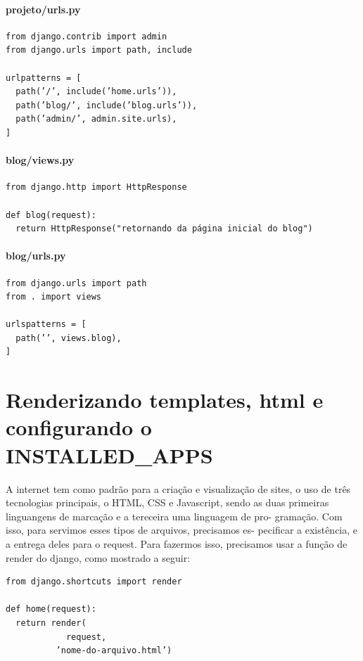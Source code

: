 \documentclass[12pt, a4paper]{paper}
\begin{document}
\paragraph{projeto/urls.py} %
\label{par:projeto/urls.py}
\begin{verbatim}
from django.contrib import admin
from django.urls import path, include

urlpatterns = [
  path(’/’, include(’home.urls’)),
  path(’blog/’, include(’blog.urls’)),
  path(’admin/’, admin.site.urls),
]
\end{verbatim}

\paragraph{blog/views.py} %
\label{par:blog/views.py}

\begin{verbatim}
from django.http import HttpResponse

def blog(request):
  return HttpResponse("retornando da página inicial do blog")
\end{verbatim}

\paragraph{blog/urls.py} %
\label{par:blog/urls.py}
\begin{verbatim}
from django.urls import path
from . import views

urlspatterns = [
  path(’’, views.blog),
]
\end{verbatim}


\section{Renderizando templates, html e configurando o INSTALLED\_APPS} %
\label{sec:Renderizando templates, html e configurando o INSTALLED\_APPS}
A internet tem como padrão para a criação e visualização de sites, o uso
de três tecnologias principais, o HTML, CSS e Javascript, sendo as duas
primeiras linguangens de marcação e a tereceira uma linguagem de pro-
gramação. Com isso, para servimos esses tipos de arquivos, precisamos es-
pecificar a existência, e a entrega deles para o request. Para fazermos isso,
precisamos usar a função de render do django, como mostrado a seguir:

\begin{verbatim}
from django.shortcuts import render

def home(request):
  return render(
            request,
          ’nome-do-arquivo.html’)
\end{verbatim}
\end{document}
